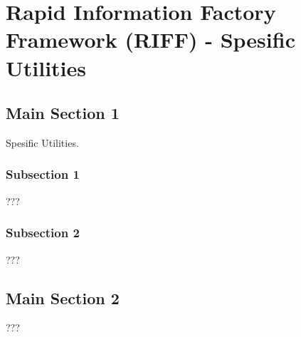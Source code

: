 
\chapter{Rapid Information Factory Framework (RIFF) - Spesific Utilities} %

\label{Chapter40} %



\section{Main Section 1}

Spesific Utilities.

\subsection{Subsection 1}

???


\subsection{Subsection 2}

???


\section{Main Section 2}

???
